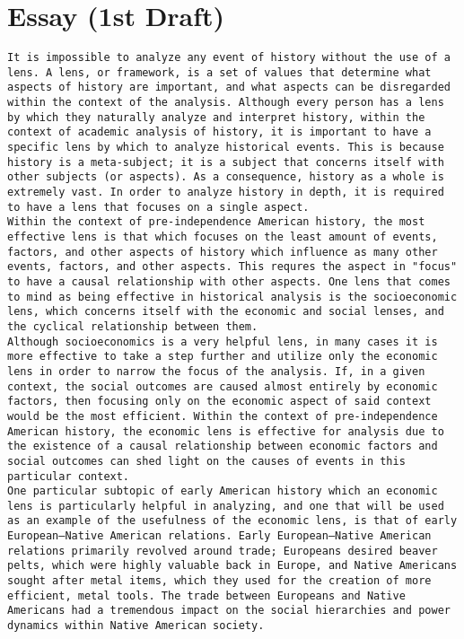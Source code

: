 \documentclass[letterpaper]{article}
\begin{document}
\section{Essay (1st Draft)}
\label{sec:org67843b7}
\begin{verbatim}
It is impossible to analyze any event of history without the use of a lens. A lens, or framework, is a set of values that determine what aspects of history are important, and what aspects can be disregarded within the context of the analysis. Although every person has a lens by which they naturally analyze and interpret history, within the context of academic analysis of history, it is important to have a specific lens by which to analyze historical events. This is because history is a meta-subject; it is a subject that concerns itself with other subjects (or aspects). As a consequence, history as a whole is extremely vast. In order to analyze history in depth, it is required to have a lens that focuses on a single aspect.
Within the context of pre-independence American history, the most effective lens is that which focuses on the least amount of events, factors, and other aspects of history which influence as many other events, factors, and other aspects. This requres the aspect in "focus" to have a causal relationship with other aspects. One lens that comes to mind as being effective in historical analysis is the socioeconomic lens, which concerns itself with the economic and social lenses, and the cyclical relationship between them. 
Although socioeconomics is a very helpful lens, in many cases it is more effective to take a step further and utilize only the economic lens in order to narrow the focus of the analysis. If, in a given context, the social outcomes are caused almost entirely by economic factors, then focusing only on the economic aspect of said context would be the most efficient. Within the context of pre-independence American history, the economic lens is effective for analysis due to the existence of a causal relationship between economic factors and social outcomes can shed light on the causes of events in this particular context.
One particular subtopic of early American history which an economic lens is particularly helpful in analyzing, and one that will be used as an example of the usefulness of the economic lens, is that of early European–Native American relations. Early European–Native American relations primarily revolved around trade; Europeans desired beaver pelts, which were highly valuable back in Europe, and Native Americans sought after metal items, which they used for the creation of more efficient, metal tools. The trade between Europeans and Native Americans had a tremendous impact on the social hierarchies and power dynamics within Native American society.

\end{verbatim}
\end{document}
